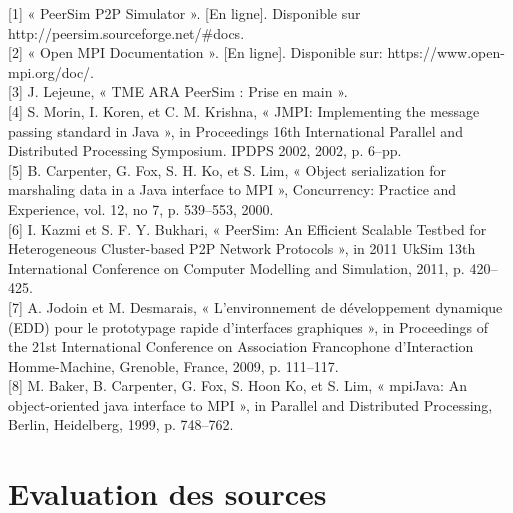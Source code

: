 \documentclass{article}
\begin{document}
		[1]    « PeerSim P2P Simulator ». [En ligne]. Disponible sur http://peersim.sourceforge.net/#docs.
		\\[2mm]		
		[2]    « Open MPI Documentation ». [En ligne]. Disponible sur: https://www.open-mpi.org/doc/.       
		\\[2mm]			
		[3]          J. Lejeune, « TME ARA PeerSim : Prise en main ».
		\\[2mm]		
		[4]    S. Morin, I. Koren, et C. M. Krishna, « JMPI: Implementing the message passing standard in Java », in Proceedings 16th International Parallel and Distributed Processing Symposium. IPDPS 2002, 2002, p. 6–pp.          
		\\[2mm]	
		[5]    B. Carpenter, G. Fox, S. H. Ko, et S. Lim, « Object serialization for marshaling data in a Java interface to MPI », Concurrency: Practice and Experience, vol. 12, no 7, p. 539–553, 2000.
		\\[2mm]		
		[6]          I. Kazmi et S. F. Y. Bukhari, « PeerSim: An Efficient Scalable Testbed for Heterogeneous Cluster-based P2P Network Protocols », in 2011 UkSim 13th International Conference on Computer Modelling and Simulation, 2011, p. 420–425. 
		\\[2mm]		
		[7]          A. Jodoin et M. Desmarais, « L’environnement de développement dynamique (EDD) pour le prototypage rapide d’interfaces graphiques », in Proceedings of the 21st International Conference on Association Francophone d’Interaction Homme-Machine, Grenoble, France, 2009, p. 111–117. 
		\\[2mm]
		[8]       M. Baker, B. Carpenter, G. Fox, S. Hoon Ko, et S. Lim, « mpiJava: An object-oriented java interface to MPI », in Parallel and Distributed Processing, Berlin, Heidelberg, 1999, p. 748–762.
		
		\newpage
		\section{Evaluation des sources}
\end{document}
